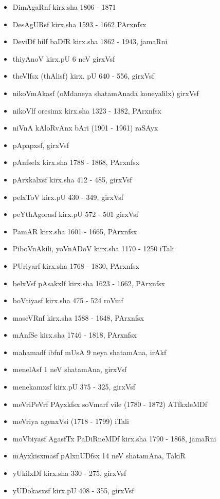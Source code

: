 {\begin{itemize}
\item DimAgaRnf kirx.sha {\rm 1806 - 1871}
\item DesAgURsf kirx.sha {\rm 1593 - 1662} PArxnfsx
\item DeviDf hilf baDfR kirx.sha {\rm 1862 - 1943}, jamaRni
\item thiyAnoV kirx.pU {\rm 6} neV girxVsf
\item theVlfsx (thAlisf) kirx. pU {\rm 640 - 556}, girxVsf
\item nikoVmAkasf (oMdaneya shatamAnada koneyalilx) girxVsf
\item nikoVlf oresimx kirx.sha {\rm 1323 - 1382}, PArxnfsx
\item niVnA kAloRvAnx bAri {\rm (1901 - 1961)} raSAyx
\item pApapxsf, girxVsf
\item pAnfselx kirx.sha {\rm 1788 - 1868}, PArxnfsx
\item pArxkalxsf kirx.sha {\rm 412 - 485}, girxVsf
\item pelxToV kirx.pU {\rm 430 - 349}, girxVsf
\item peYthAgorasf kirx.pU {\rm 572 - 501} girxVsf
\item PamAR kirx.sha {\rm 1601 - 1665}, PArxnfsx
\item PiboVnAkili, yoVnADoV kirx.sha {\rm 1170 - 1250} iTali
\item PUriyarf kirx.sha {\rm 1768 - 1830}, PArxnfsx
\item belxVsf pAsakxlf kirx.sha {\rm 1623 - 1662}, PArxnfsx
\item boVtiyasf kirx.sha {\rm 475 - 524} roVmf
\item maseVRnf kirx.sha {\rm 1588 - 1648}, PArxnfsx
\item mAnfSe kirx.sha {\rm 1746 - 1818}, PArxnfsx
\item mahamadf ibfnf mUsA {\rm 9} neya shatamAna, irAkf
\item menelAsf {\rm 1} neV shatamAna, girxVsf
\item menekamxsf kirx.pU {\rm 375 - 325}, girxVsf 
\item meVriPeVrf PAyxkfsx soVmarf vile {\rm (1780 - 1872)} ATfkxleMDf
\item meVriya agenxVsi {\rm (1718 - 1799)} iTali
\item moVbiyasf AgasfTx PaDiRneMDf kirx.sha {\rm 1790 - 1868}, jamaRni
\item mAyxkisxmasf pAlxnUDfsx {\rm 14} neV shatamAna, TakiR
\item yUkilxDf kirx.sha {\rm 330 - 275}, girxVsf
\item yUDokasxsf kirx.pU {\rm 408 - 355}, girxVsf

\end{itemize}}
